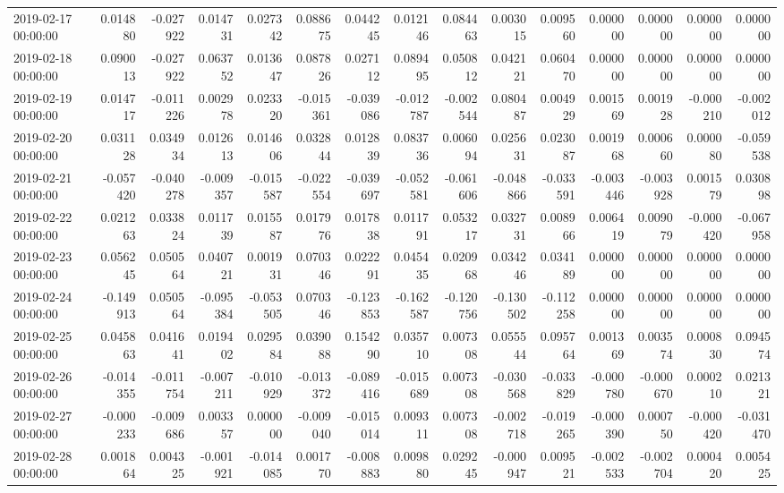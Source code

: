 \begin{tabular}{lrrrrrrrrrrrrrr}
2019-02-17 00:00:00 & 0.014880 & -0.027922 & 0.014731 & 0.027342 & 0.088675 & 0.044245 & 0.012146 & 0.084463 & 0.003015 & 0.009560 & 0.000000 & 0.000000 & 0.000000 & 0.000000 \\
2019-02-18 00:00:00 & 0.090013 & -0.027922 & 0.063752 & 0.013647 & 0.087826 & 0.027112 & 0.089495 & 0.050812 & 0.042121 & 0.060470 & 0.000000 & 0.000000 & 0.000000 & 0.000000 \\
2019-02-19 00:00:00 & 0.014717 & -0.011226 & 0.002978 & 0.023320 & -0.015361 & -0.039086 & -0.012787 & -0.002544 & 0.080487 & 0.004929 & 0.001569 & 0.001928 & -0.000210 & -0.002012 \\
2019-02-20 00:00:00 & 0.031128 & 0.034934 & 0.012613 & 0.014606 & 0.032844 & 0.012839 & 0.083736 & 0.006094 & 0.025631 & 0.023087 & 0.001968 & 0.000660 & 0.000080 & -0.059538 \\
2019-02-21 00:00:00 & -0.057420 & -0.040278 & -0.009357 & -0.015587 & -0.022554 & -0.039697 & -0.052581 & -0.061606 & -0.048866 & -0.033591 & -0.003446 & -0.003928 & 0.001579 & 0.030898 \\
2019-02-22 00:00:00 & 0.021263 & 0.033824 & 0.011739 & 0.015587 & 0.017976 & 0.017838 & 0.011791 & 0.053217 & 0.032731 & 0.008966 & 0.006419 & 0.009079 & -0.000420 & -0.067958 \\
2019-02-23 00:00:00 & 0.056245 & 0.050564 & 0.040721 & 0.001931 & 0.070346 & 0.022291 & 0.045435 & 0.020968 & 0.034246 & 0.034189 & 0.000000 & 0.000000 & 0.000000 & 0.000000 \\
2019-02-24 00:00:00 & -0.149913 & 0.050564 & -0.095384 & -0.053505 & 0.070346 & -0.123853 & -0.162587 & -0.120756 & -0.130502 & -0.112258 & 0.000000 & 0.000000 & 0.000000 & 0.000000 \\
2019-02-25 00:00:00 & 0.045863 & 0.041641 & 0.019402 & 0.029584 & 0.039088 & 0.154290 & 0.035710 & 0.007308 & 0.055544 & 0.095764 & 0.001369 & 0.003574 & 0.000830 & 0.094574 \\
2019-02-26 00:00:00 & -0.014355 & -0.011754 & -0.007211 & -0.010929 & -0.013372 & -0.089416 & -0.015689 & 0.007308 & -0.030568 & -0.033829 & -0.000780 & -0.000670 & 0.000210 & 0.021321 \\
2019-02-27 00:00:00 & -0.000233 & -0.009686 & 0.003357 & 0.000000 & -0.009040 & -0.015014 & 0.009311 & 0.007308 & -0.002718 & -0.019265 & -0.000390 & 0.000750 & -0.000420 & -0.031470 \\
2019-02-28 00:00:00 & 0.001864 & 0.004325 & -0.001921 & -0.014085 & 0.001770 & -0.008883 & 0.009880 & 0.029245 & -0.000947 & 0.009521 & -0.002533 & -0.002704 & 0.000420 & 0.005425 \\

\end{tabular}
